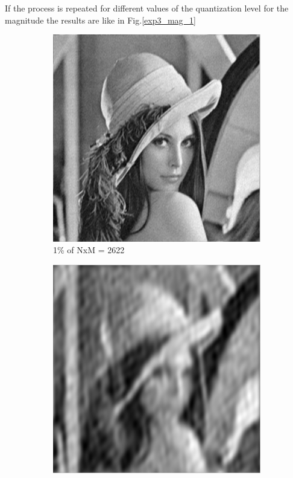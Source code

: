 \documentclass[a4paper, 10pt, conference] {article}
\begin{document}
  If  the process is repeated for different values of the quantization level for the magnitude the results are like in Fig.\ref{exp3_mag_1}
  \begin{figure}[H]
  	\centering
  	\begin{subfigure}{0.32\textwidth} 
  		\centering						
  		\includegraphics[scale=0.33]{reportImages/exp3_mag001.PNG}
  		\caption{1\% of NxM = 2622}
  	\end{subfigure}
  	\begin{subfigure}{0.32\textwidth}
  		\centering
  		\includegraphics[scale=0.33]{reportImages/exp3_mag0001.PNG}

\end{subfigure}
\end{figure}
\end{document}
